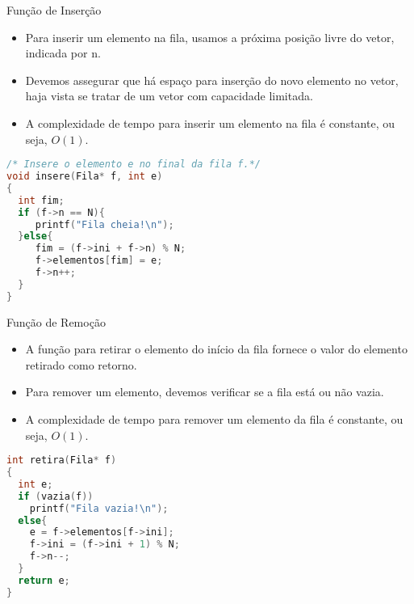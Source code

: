 \begin{frame}[fragile]{Função de Inserção}  
	\begin{itemize}
		\item Para inserir um elemento na fila, usamos a próxima posição livre do vetor, indicada por \alert{n}.
		\item Devemos assegurar que há espaço para inserção do novo elemento no vetor, haja vista se tratar de um vetor com capacidade limitada. 
		\item A complexidade de tempo para inserir um elemento na fila é constante, ou seja, $O(1)$.
	\end{itemize}
\footnotesize
\begin{lstlisting}[language=C]
/* Insere o elemento e no final da fila f.*/
void insere(Fila* f, int e)
{
  int fim;
  if (f->n == N){
     printf("Fila cheia!\n");
  }else{
     fim = (f->ini + f->n) % N;
     f->elementos[fim] = e;  
     f->n++;
  }
}
\end{lstlisting}	
\end{frame}

\begin{frame}[fragile]{Função de Remoção} 
	\begin{itemize}
		\item A função para retirar o elemento do início da fila fornece o valor do elemento retirado como retorno.
		\item Para remover um elemento, devemos verificar se a fila está ou não vazia.
		\item A complexidade de tempo para remover um elemento da fila é constante, ou seja, $O(1)$.
	\end{itemize}
	
\footnotesize
\begin{lstlisting}[language=C]
int retira(Fila* f)
{
  int e;
  if (vazia(f))
    printf("Fila vazia!\n");
  else{
    e = f->elementos[f->ini];
    f->ini = (f->ini + 1) % N;
    f->n--;
  }
  return e;
}
\end{lstlisting}	
\end{frame} 

%

